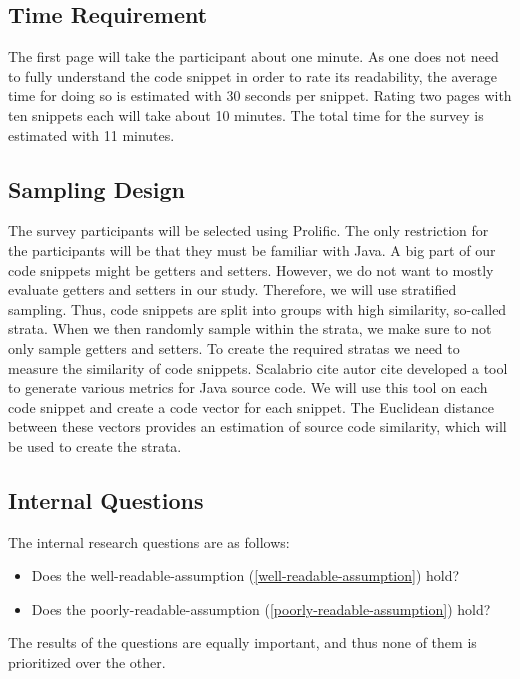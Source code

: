 \documentclass[%
class=scrreprt,
chapterprefix=false,%
open=right,%
twoside=false,%
paper=a4,%
logofile={Logo\_zentral\_farbig\_EN.png},%
thesistype=masterproposal,%
UKenglish,%
]{se2thesis}
\begin{document}
\subsection{Time Requirement}
The first page will take the participant about one minute. As one does not need to fully understand the code snippet in order to rate its readability, the average time for doing so is estimated with 30 seconds per snippet. Rating two pages with ten snippets each will take about 10 minutes. The total time for the survey is estimated with 11 minutes.

\subsection{Sampling Design}
The survey participants will be selected using Prolific. The only restriction for the participants will be that they must be familiar with Java.
A big part of our code snippets might be getters and setters. However, we do not want to mostly evaluate getters and setters in our study. Therefore, we will use stratified sampling. Thus, code snippets are split into groups with high similarity, so-called strata. When we then randomly sample within the strata, we make sure to not only sample getters and setters.
To create the required stratas we need to measure the similarity of code snippets. Scalabrio cite autor cite developed a tool to generate various metrics for Java source code. We will use this tool on each code snippet and create a code vector for each snippet. The Euclidean distance between these vectors provides an estimation of source code similarity, which will be used to create the strata.

\subsection{Internal Questions} %
The internal research questions are as follows:
\begin{itemize}
	\item Does the well-readable-assumption (\ref{well-readable-assumption}) hold?
	\item Does the poorly-readable-assumption (\ref{poorly-readable-assumption}) hold?
\end{itemize}
The results of the questions are equally important, and thus none of them is prioritized over the other.
\end{document}
